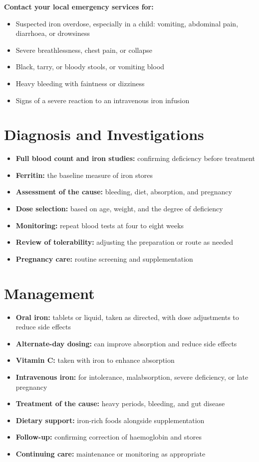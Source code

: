 \textbf{Contact your local emergency services for:}
\begin{itemize}
    \item Suspected iron overdose, especially in a child: vomiting, abdominal pain, diarrhoea, or drowsiness
    \item Severe breathlessness, chest pain, or collapse
    \item Black, tarry, or bloody stools, or vomiting blood
    \item Heavy bleeding with faintness or dizziness
    \item Signs of a severe reaction to an intravenous iron infusion
\end{itemize}

\section*{Diagnosis and Investigations}
\begin{itemize}
    \item \textbf{Full blood count and iron studies:} confirming deficiency before treatment
    \item \textbf{Ferritin:} the baseline measure of iron stores
    \item \textbf{Assessment of the cause:} bleeding, diet, absorption, and pregnancy
    \item \textbf{Dose selection:} based on age, weight, and the degree of deficiency
    \item \textbf{Monitoring:} repeat blood tests at four to eight weeks
    \item \textbf{Review of tolerability:} adjusting the preparation or route as needed
    \item \textbf{Pregnancy care:} routine screening and supplementation
\end{itemize}

\section*{Management}
\begin{itemize}
    \item \textbf{Oral iron:} tablets or liquid, taken as directed, with dose adjustments to reduce side effects
    \item \textbf{Alternate-day dosing:} can improve absorption and reduce side effects
    \item \textbf{Vitamin C:} taken with iron to enhance absorption
    \item \textbf{Intravenous iron:} for intolerance, malabsorption, severe deficiency, or late pregnancy
    \item \textbf{Treatment of the cause:} heavy periods, bleeding, and gut disease
    \item \textbf{Dietary support:} iron-rich foods alongside supplementation
    \item \textbf{Follow-up:} confirming correction of haemoglobin and stores
    \item \textbf{Continuing care:} maintenance or monitoring as appropriate
\end{itemize}


